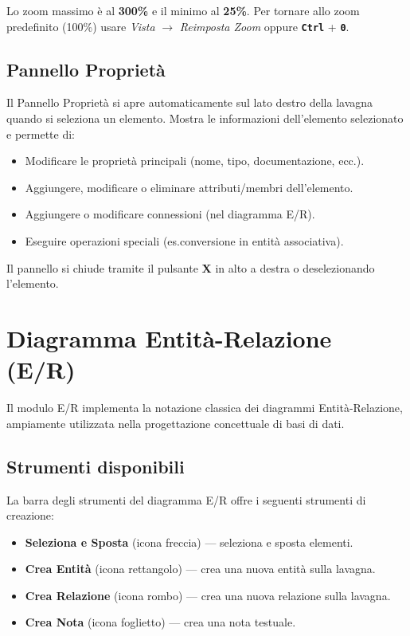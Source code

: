 \documentclass[a4paper,11pt]{article}
\newcommand{\key}[1]{\texttt{\textbf{#1}}}
\newcommand{\menu}[1]{\textit{#1}}
\newcommand{\uielement}[1]{\textbf{#1}}
\begin{document}
\begin{tcolorbox}[tipbox, title={Suggerimento}]
  Lo zoom massimo è al \textbf{300\%} e il minimo al \textbf{25\%}. Per tornare allo zoom
  predefinito (100\%) usare \menu{Vista} $\to$ \menu{Reimposta Zoom} oppure \key{Ctrl} + \key{0}.
\end{tcolorbox}

\subsection{Pannello Proprietà}

Il Pannello Proprietà si apre automaticamente sul lato destro della lavagna quando si seleziona
un elemento. Mostra le informazioni dell'elemento selezionato e permette di:

\begin{itemize}
  \item Modificare le proprietà principali (nome, tipo, documentazione, ecc.).
  \item Aggiungere, modificare o eliminare attributi/membri dell'elemento.
  \item Aggiungere o modificare connessioni (nel diagramma E/R).
  \item Eseguire operazioni speciali (es.\@ conversione in entità associativa).
\end{itemize}

Il pannello si chiude tramite il pulsante \textbf{X} in alto a destra o deselezionando
l'elemento.

\section{Diagramma Entità-Relazione (E/R)}
\label{sec:er}

Il modulo E/R implementa la notazione classica dei diagrammi Entità-Relazione, ampiamente
utilizzata nella progettazione concettuale di basi di dati.

\subsection{Strumenti disponibili}

La barra degli strumenti del diagramma E/R offre i seguenti strumenti di creazione:

\begin{itemize}
  \item \uielement{Seleziona e Sposta} (icona freccia) --- seleziona e sposta elementi.
  \item \uielement{Crea Entità} (icona rettangolo) --- crea una nuova entità sulla lavagna.
  \item \uielement{Crea Relazione} (icona rombo) --- crea una nuova relazione sulla lavagna.
  \item \uielement{Crea Nota} (icona foglietto) --- crea una nota testuale.
\end{itemize}
\end{document}
